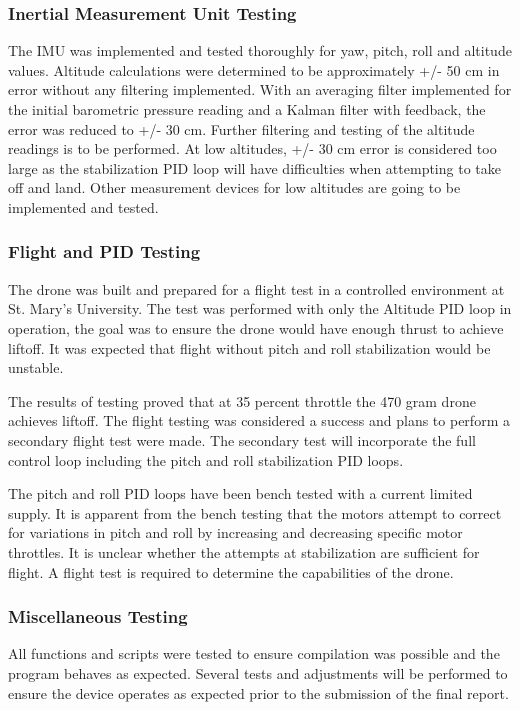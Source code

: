 \subsubsection{Inertial Measurement Unit Testing}

The IMU was implemented and tested thoroughly for yaw, pitch, roll and altitude values. Altitude calculations were determined to be approximately +/- 50 cm in error without any filtering implemented. With an averaging filter implemented for the initial barometric pressure reading and a Kalman filter with feedback, the error was reduced to +/- 30 cm. Further filtering and testing of the altitude readings is to be performed. At low altitudes, +/- 30 cm error is considered too large as the stabilization PID loop will have difficulties when attempting to take off and land. Other measurement devices for low altitudes are going to be implemented and tested.

\subsubsection{Flight and PID Testing}

The drone was built and prepared for a flight test in a controlled environment at St. Mary's University. The test was performed with only the Altitude PID loop in operation, the goal was to ensure the drone would have enough thrust to achieve liftoff. It was expected that flight without pitch and roll stabilization would be unstable.

The results of testing proved that at 35 percent throttle the 470 gram drone achieves liftoff. The flight testing was considered a success and plans to perform a secondary flight test were made. The secondary test will incorporate the full control loop including the pitch and roll stabilization PID loops.

The pitch and roll PID loops have been bench tested with a current limited supply. It is apparent from the bench testing that the motors attempt to correct for variations in pitch and roll by increasing and decreasing specific motor throttles. It is unclear whether the attempts at stabilization are sufficient for flight. A flight test is required to determine the capabilities of the drone.

\subsubsection{Miscellaneous Testing}

All functions and scripts were tested to ensure compilation was possible and the program behaves as expected. Several tests and adjustments will be performed to ensure the device operates as expected prior to the submission of the final report. 

